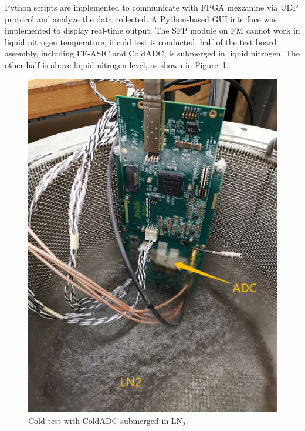 Python scripts are implemented to communicate with FPGA mezzanine via UDP protocol and analyze the data collected. A Python-based GUI interface was implemented to display real-time output.
The SFP module on FM cannot work in liquid nitrogen temperature, if cold test is conducted, half of the test board assembly, including FE-ASIC and ColdADC, is submerged in liquid nitrogen. The other half is above liquid nitrogen level, as shown in Figure~\ref{fig:bnl_coldtest}.    
\begin{figure}[!ht]
\centering
 \includegraphics[width=0.5\linewidth]{figures/BNL_coldtest.png}
  \caption{Cold test with ColdADC submerged in LN$_2$.}
  \label{fig:bnl_coldtest}
\end{figure}
